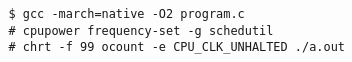 
\begin{verbatim}
   $ gcc -march=native -O2 program.c
   # cpupower frequency-set -g schedutil
   # chrt -f 99 ocount -e CPU_CLK_UNHALTED ./a.out
\end{verbatim}



